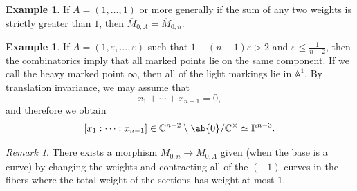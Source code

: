\documentclass{amsart}
\theoremstyle{definition}
\newtheorem{exm}[thm]{Example}
\theoremstyle{remark}
\newtheorem{rmk}[thm]{Remark}
\theoremstyle{plain}
\theoremstyle{definition}
\theoremstyle{remark}
\newcommand{\A}{\mathbb{A}}
\newcommand{\C}{\mathbb{C}}
\renewcommand{\P}{\mathbb{P}}
\newcommand{\ep}{\varepsilon}
\newcommand{\ol}[1]{\overline{#1}}
\newcommand{\1}{\mathbf{1}}
\newcommand{\2}{\mathbf{2}}
\newcommand{\3}{\mathbf{3}}
\begin{document}
\begin{exm}
    If \(A = (1, \ldots, 1)\) or more generally if the sum of any two weights is strictly greater than \(1\), then \(\ol{M}_{0, A} = \ol{M}_{0,n}\).
\end{exm}

\begin{exm}
    If \(A = (1, \ep, \ldots, \ep)\) such that \(1-(n-1)\ep > 2\) and \(\ep \leq \frac{1}{n-2}\), then the combinatorics imply that all marked points lie on the same component. If we call the heavy marked point \(\infty\), then all of the light markings lie in \(\A^1\). By translation invariance, we may assume that
    \[ x_1 + \cdots + x_{n-1} = 0, \]
    and therefore we obtain 
    \[ [x_1 : \cdots : x_{n-1}] \in \C^{n-2} \setminus \ab\{0\} / \C^{\times} \simeq \P^{n-3}. \]
\end{exm}

\begin{rmk}
    There exists a morphism \(\ol{M}_{0,n} \to \ol{M}_{0, A}\) given (when the base is a curve) by changing the weights and contracting all of the \((-1)\)-curves in the fibers where the total weight of the sections has weight at most \(1\).
\end{rmk}
\end{document}
